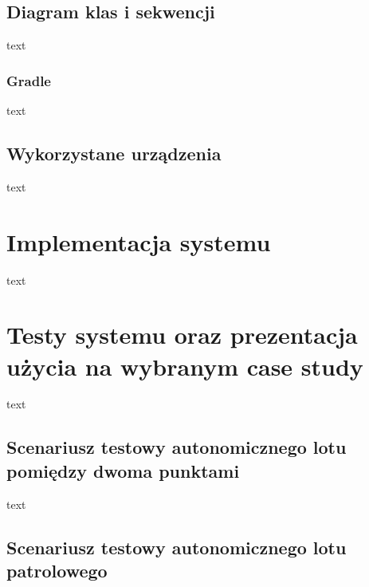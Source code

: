 \documentclass[12pt, a4paper, twoside]{report}
\begin{document}
\section{Diagram klas i sekwencji}
\hspace{1cm}text
\subsection{Gradle}
\hspace{1cm}text
\section{Wykorzystane urządzenia}
\hspace{1cm}text

\chapter{Implementacja systemu}
\hspace{1cm}text

\chapter{Testy systemu oraz prezentacja użycia na wybranym case study}
\hspace{1cm}text
\section{Scenariusz testowy autonomicznego lotu pomiędzy dwoma punktami}
\hspace{1cm}text
\section{Scenariusz testowy autonomicznego lotu patrolowego}

            
\end{document}
